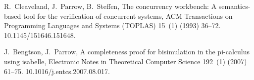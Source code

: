 \documentclass[GCNS]{yincog}
\theoremstyle{remark}
\theoremstyle{theorem}
\theoremstyle{remark}
\begin{document}
\begin{backmatter}
\begin{thebibliography}{}
\begin{bsubitem}
\begin{bcontribution}%
\end{bcontribution}
\begin{bhost}
\begin{bissue}
\end{bissue}
\end{bhost}
\end{bsubitem}
%
\OrigBibText
R.~Cleaveland, J.~Parrow, B.~Steffen, The concurrency workbench: A semantics-based
tool for the verification of concurrent systems, ACM Transactions on Programming
Languages and Systems (TOPLAS) 15~(1) (1993) 36--72. 10.1145/151646.151648.
\endOrigBibText
{}%
\endbibitem

\begin{bsubitem}
\begin{bcontribution}%
\end{bcontribution}
\begin{bhost}
\begin{bissue}
\end{bissue}
\end{bhost}
\end{bsubitem}
%
\OrigBibText
J.~Bengtson, J.~Parrow, A completeness proof for bisimulation in the pi-calculus
using isabelle, Electronic Notes in Theoretical Computer Science 192~(1)
(2007) 61--75. 10.1016/j.entcs.2007.08.017.
\endOrigBibText
{}%
\endbibitem


\end{thebibliography}
\end{backmatter}
\end{document}
